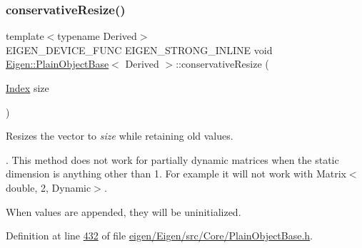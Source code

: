 \mbox{\label{class_eigen_1_1_plain_object_base_a5429214e7c1ffaf7294a93a5cec62007}} 
\subsubsection{\texorpdfstring{conservative\+Resize()}{conservativeResize()}\hspace{0.1cm}{\footnotesize\ttfamily [7/8]}}
{\footnotesize\ttfamily template$<$typename Derived$>$ \\
E\+I\+G\+E\+N\+\_\+\+D\+E\+V\+I\+C\+E\+\_\+\+F\+U\+NC E\+I\+G\+E\+N\+\_\+\+S\+T\+R\+O\+N\+G\+\_\+\+I\+N\+L\+I\+NE void \hyperlink{class_eigen_1_1_plain_object_base}{Eigen\+::\+Plain\+Object\+Base}$<$ Derived $>$\+::conservative\+Resize (\begin{DoxyParamCaption}\item[{\hyperlink{namespace_eigen_a62e77e0933482dafde8fe197d9a2cfde}{Index}}]{size }\end{DoxyParamCaption})\hspace{0.3cm}{\ttfamily [inline]}}

Resizes the vector to {\itshape size} while retaining old values.

. This method does not work for partially dynamic matrices when the static dimension is anything other than 1. For example it will not work with Matrix$<$double, 2, Dynamic$>$.

When values are appended, they will be uninitialized. 

Definition at line \hyperlink{eigen_2_eigen_2src_2_core_2_plain_object_base_8h_source_l00432}{432} of file \hyperlink{eigen_2_eigen_2src_2_core_2_plain_object_base_8h_source}{eigen/\+Eigen/src/\+Core/\+Plain\+Object\+Base.\+h}.

\mbox{\label{class_eigen_1_1_plain_object_base_a5429214e7c1ffaf7294a93a5cec62007}} 
